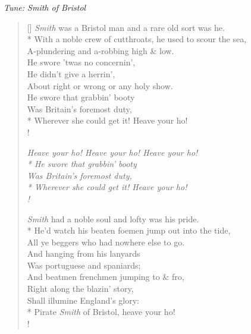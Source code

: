 \documentclass[MAIN]{subfiles}
\begin{document}
\begin{center}
\emph{Tune: Smith of Bristol}
\end{center}

\bigskip

\settowidth{\versewidth}{With a noble crew of cutthroats, he used to scour the sea,}
\begin{verse}[\versewidth]
\emph{Smith} was a {\sc Bristol} man and a rare old sort was he.\\*
With a noble crew of cutthroats, he used to scour the sea,\\
A-plundering and a-robbing high \& low.\\
He swore 'twas no concernin',\\
He didn't give a herrin',\\
About right or wrong or any holy show.\\
He swore that grabbin' booty\\
Was Britain's foremost duty,\\*
Wherever she could get it! Heave your ho!\\!

{\it Heave your ho! Heave your ho! Heave your ho!\\*
He swore that grabbin' booty\\
Was Britain's foremost duty,\\*
Wherever she could get it! Heave your ho!\\!}

\emph{Smith} had a noble soul and lofty was his pride.\\*
He'd watch his beaten foemen jump out into the tide,\\
All ye beggers who had nowhere else to go.\\
And hanging from his lanyards\\
Was portuguese and spaniards;\\
And beatmen frenchmen jumping to \& fro,\\
Right along the blazin' story,\\
Shall illumine England's glory:\\*
Pirate \emph{Smith} of {\sc Bristol}, heave your ho!\\!


\end{verse}
\end{document}
